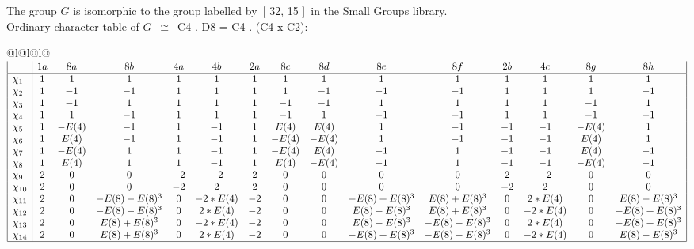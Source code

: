 \documentclass[varwidth=\maxdimen,border=10]{standalone}
\begin{document}
The group $G$ is isomorphic to the group labelled by\ [ 32, 15 ]\ in the Small Groups library.\\
Ordinary character table of $G$\ $\cong$\ C4 . D8 = C4 . (C4 x C2):\\
\begin{center}
\begin{tabular}{@{}l@{}l@{}l@{}}
\hline
\(\begin{array}{|l|cccccccccccccc|}
  & 1a & 8a & 8b & 4a & 4b & 2a & 8c & 8d & 8e & 8f & 2b & 4c & 8g & 8h\\ \hline
\chi_{1} & 1 & 1 & 1 & 1 & 1 & 1 & 1 & 1 & 1 & 1 & 1 & 1 & 1 & 1\\
\chi_{2} & 1 & -1 & -1 & 1 & 1 & 1 & 1 & -1 & -1 & -1 & 1 & 1 & 1 & -1\\
\chi_{3} & 1 & -1 & 1 & 1 & 1 & 1 & -1 & -1 & 1 & 1 & 1 & 1 & -1 & 1\\
\chi_{4} & 1 & 1 & -1 & 1 & 1 & 1 & -1 & 1 & -1 & -1 & 1 & 1 & -1 & -1\\
\chi_{5} & 1 & -E(4) & -1 & 1 & -1 & 1 & E(4) & E(4) & 1 & -1 & -1 & -1 & -E(4) & 1\\
\chi_{6} & 1 & E(4) & -1 & 1 & -1 & 1 & -E(4) & -E(4) & 1 & -1 & -1 & -1 & E(4) & 1\\
\chi_{7} & 1 & -E(4) & 1 & 1 & -1 & 1 & -E(4) & E(4) & -1 & 1 & -1 & -1 & E(4) & -1\\
\chi_{8} & 1 & E(4) & 1 & 1 & -1 & 1 & E(4) & -E(4) & -1 & 1 & -1 & -1 & -E(4) & -1\\
\chi_{9} & 2 & 0 & 0 & -2 & -2 & 2 & 0 & 0 & 0 & 0 & 2 & -2 & 0 & 0\\
\chi_{10} & 2 & 0 & 0 & -2 & 2 & 2 & 0 & 0 & 0 & 0 & -2 & 2 & 0 & 0\\
\chi_{11} & 2 & 0 & -E(8)-E(8)^{3} & 0 & -2*E(4) & -2 & 0 & 0 & -E(8)+E(8)^{3} & E(8)+E(8)^{3} & 0 & 2*E(4) & 0 & E(8)-E(8)^{3}\\
\chi_{12} & 2 & 0 & -E(8)-E(8)^{3} & 0 & 2*E(4) & -2 & 0 & 0 & E(8)-E(8)^{3} & E(8)+E(8)^{3} & 0 & -2*E(4) & 0 & -E(8)+E(8)^{3}\\
\chi_{13} & 2 & 0 & E(8)+E(8)^{3} & 0 & -2*E(4) & -2 & 0 & 0 & E(8)-E(8)^{3} & -E(8)-E(8)^{3} & 0 & 2*E(4) & 0 & -E(8)+E(8)^{3}\\
\chi_{14} & 2 & 0 & E(8)+E(8)^{3} & 0 & 2*E(4) & -2 & 0 & 0 & -E(8)+E(8)^{3} & -E(8)-E(8)^{3} & 0 & -2*E(4) & 0 & E(8)-E(8)^{3}\\
\hline
\end{array}\)\\
\end{tabular}
\end{center}
\end{document}
